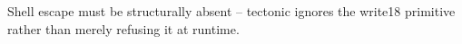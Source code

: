 \documentclass{article}
\begin{document}
\immediate{}
Shell escape must be structurally absent -- tectonic ignores the write18 primitive rather
than merely refusing it at runtime.
\end{document}
